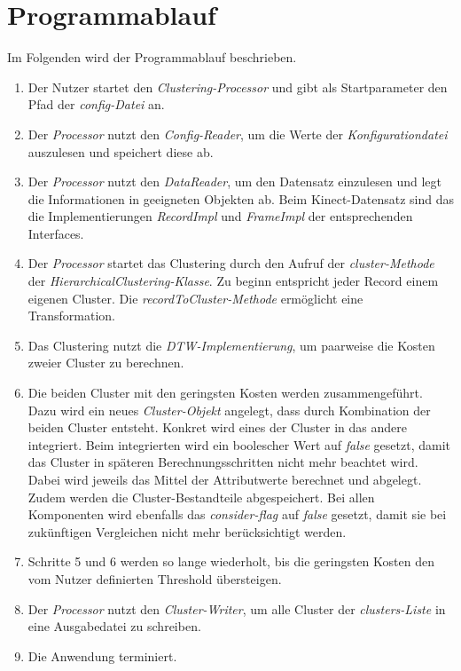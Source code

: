 \section{Programmablauf}
\label{4-Programmablauf}
Im Folgenden wird der Programmablauf beschrieben.
\begin{enumerate}
    \item Der Nutzer startet den \emph{Clustering-Processor}
    und gibt als Startparameter den Pfad der \emph{config-Datei} an.
    \item Der \emph{Processor} nutzt den \emph{Config-Reader}, um die Werte der \emph{Konfigurationdatei} auszulesen
    und speichert diese ab.
    \item Der \emph{Processor} nutzt den \emph{DataReader}, um den Datensatz einzulesen
    und legt die Informationen in geeigneten Objekten ab.
    Beim Kinect-Datensatz sind das die Implementierungen \emph{RecordImpl} und \emph{FrameImpl}
    der entsprechenden Interfaces.
    \item Der \emph{Processor} startet das Clustering durch den Aufruf der \emph{cluster-Methode}
    der \emph{HierarchicalClustering-Klasse}.
    Zu beginn entspricht jeder Record einem eigenen Cluster.
    Die \emph{recordToCluster-Methode} ermöglicht eine Transformation.
    \item Das Clustering nutzt die \emph{\ac{DTW}-Implementierung},
    um paarweise die Kosten zweier Cluster zu berechnen.
    \item Die beiden Cluster mit den geringsten Kosten werden zusammengeführt.
    Dazu wird ein neues \emph{Cluster-Objekt} angelegt, dass durch Kombination der beiden Cluster entsteht.
    Konkret wird eines der Cluster in das andere integriert.
    Beim integrierten wird ein boolescher Wert auf \emph{false} gesetzt,
    damit das Cluster in späteren Berechnungsschritten nicht mehr beachtet wird.
    Dabei wird jeweils das Mittel der Attributwerte berechnet und abgelegt.
    Zudem werden die Cluster-Bestandteile abgespeichert.
    Bei allen Komponenten wird ebenfalls das \emph{consider-flag} auf \emph{false} gesetzt,
    damit sie bei zukünftigen Vergleichen nicht mehr berücksichtigt werden.
    \item Schritte 5 und 6 werden so lange wiederholt, bis die geringsten Kosten den vom Nutzer definierten Threshold übersteigen.
    \item Der \emph{Processor} nutzt den \emph{Cluster-Writer}, um alle Cluster der \emph{clusters-Liste}
    in eine Ausgabedatei zu schreiben.
    \item Die Anwendung terminiert. 

\end{enumerate}


